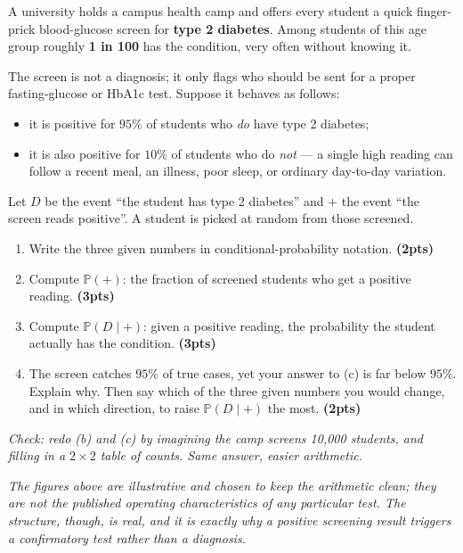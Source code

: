 \documentclass[11pt,a4paper]{article}
\newcommand{\pts}[1]{\hfill\textbf{(#1pts)}}
\newcommand{\PP}{\mathbb{P}}
\newenvironment{parts}
  {\begin{enumerate}\setlength{\itemsep}{0.45em}\setlength{\parskip}{0pt}}
  {\end{enumerate}}
\begin{document}
A university holds a campus health camp and offers every student a quick
finger-prick blood-glucose screen for \textbf{type 2 diabetes}. Among students of
this age group roughly \textbf{1 in 100} has the condition, very often without
knowing it.

The screen is not a diagnosis; it only flags who should be sent for a proper
fasting-glucose or HbA1c test. Suppose it behaves as follows:

\begin{itemize}\setlength{\itemsep}{0.3em}
  \item it is positive for $95\%$ of students who \emph{do} have type 2 diabetes;
  \item it is also positive for $10\%$ of students who do \emph{not} — a single
        high reading can follow a recent meal, an illness, poor sleep, or ordinary
        day-to-day variation.
\end{itemize}

\noindent
Let $D$ be the event ``the student has type 2 diabetes'' and $+$ the event ``the
screen reads positive''. A student is picked at random from those screened.

\begin{parts}
  \item Write the three given numbers in conditional-probability notation. \pts{2}
  \item Compute $\PP(+)$: the fraction of screened students who get a positive
        reading. \pts{3}
  \item Compute $\PP(D \mid +)$: given a positive reading, the probability the
        student actually has the condition. \pts{3}
  \item The screen catches $95\%$ of true cases, yet your answer to (c) is far
        below $95\%$. Explain why. Then say which of the three given numbers you
        would change, and in which direction, to raise $\PP(D \mid +)$ the most.
        \pts{2}
\end{parts}

\noindent\textit{Check: redo (b) and (c) by imagining the camp screens 10{,}000
students, and filling in a $2 \times 2$ table of counts. Same answer, easier
arithmetic.}

\medskip
\noindent\textit{The figures above are illustrative and chosen to keep the
arithmetic clean; they are not the published operating characteristics of any
particular test. The structure, though, is real, and it is exactly why a positive
screening result triggers a confirmatory test rather than a diagnosis.}
\end{document}
